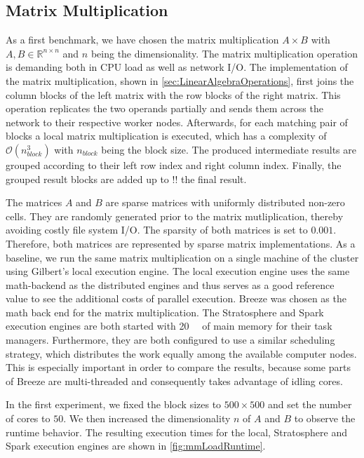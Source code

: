 \subsection{Matrix Multiplication}
\label{subsec:mm}

As a first benchmark, we have chosen the matrix multiplication $A\times B$ with $A,B \in \mathbb{R}^{n\times n}$ and $n$ being the dimensionality.
The matrix multiplication operation is demanding both in CPU load as well as network I/O.
The implementation of the matrix multiplication, shown in \cref{sec:LinearAlgebraOperations}, first joins the column blocks of the left matrix with the row blocks of the right matrix.
This operation replicates the two operands partially and sends them across the network to their respective worker nodes.
Afterwards, for each matching pair of blocks a local matrix multiplication is executed, which has a complexity of $\mathcal{O}(n_{block}^3)$ with $n_{block}$ being the block size.
The produced intermediate results are grouped according to their left row index and right column index.
Finally, the grouped result blocks are added up to !! the final result.

The matrices $A$ and $B$ are sparse matrices with uniformly distributed non-zero cells.
They are randomly generated prior to the matrix mutliplication, thereby avoiding costly file system I/O.
The sparsity of both matrices is set to $0.001$.
Therefore, both matrices are represented by sparse matrix implementations.
As a baseline, we run the same matrix multiplication on a single machine of the cluster using Gilbert's local execution engine.
The local execution engine uses the same math-backend as the distributed engines and thus serves as a good reference value to see the additional costs of parallel execution.
Breeze was chosen as the math back end for the matrix multiplication.
The Stratosphere and Spark execution engines are both started with \SI{20}{\giga\byte} of main memory for their task managers.
Furthermore, they are both configured to use a similar scheduling strategy, which distributes the work equally among the available computer nodes.
This is especially important in order to compare the results, because some parts of Breeze are multi-threaded and consequently takes advantage of idling cores.

In the first experiment, we fixed the block sizes to $500 \times 500$ and set the number of cores to $50$.
We then increased the dimensionality $n$ of $A$ and $B$ to observe the runtime behavior.
The resulting execution times for the local, Stratosphere and Spark execution engines are shown in \cref{fig:mmLoadRuntime}.

